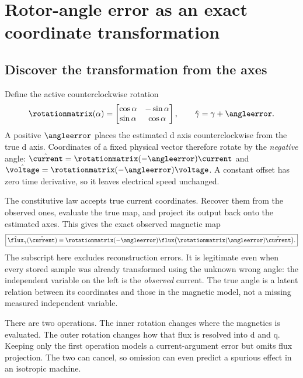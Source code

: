\section{Rotor-angle error as an exact coordinate transformation}
\label{sec:angle}
\subsection{Discover the transformation from the axes}
Define the active counterclockwise rotation
\begin{equation}
 \rotationmatrix(\alpha)=\begin{bmatrix}\cos\alpha&-\sin\alpha\\
                  \sin\alpha&\cos\alpha\end{bmatrix},\qquad
 \hat\gamma=\gamma+\angleerror.\label{eq:rotation-definition}
\end{equation}
A positive $\angleerror$ places the estimated d axis counterclockwise from the
true d axis. Coordinates of a fixed physical vector therefore rotate by the
\emph{negative} angle: $\hat\current=\rotationmatrix(-\angleerror)\current$ and
$\hat\voltage=\rotationmatrix(-\angleerror)\voltage$. A constant offset has zero time
derivative, so it leaves electrical speed unchanged.


The constitutive law accepts true current coordinates. Recover them from the
observed ones, evaluate the true map, and project its output back onto the
estimated axes. This gives the exact observed magnetic map
\begin{equation}
 \boxed{\hat\flux_\gamma(\hat\current)=\rotationmatrix(-\angleerror)
       \flux\bigl(\rotationmatrix(\angleerror)\hat\current\bigr).}
 \label{eq:pullback}
\end{equation}
The subscript here excludes reconstruction errors. It is legitimate even
when every stored sample was already transformed using the unknown wrong
angle: the independent variable on the left is the \emph{observed} current.
The true angle is a latent relation between its coordinates and those in the
magnetic model, not a missing measured independent variable.

There are two operations. The inner rotation changes where the magnetics is
evaluated. The outer rotation changes how that flux is resolved into d and q.
Keeping only the first operation models a current-argument error but omits
flux projection. The two can cancel, so omission can even predict a spurious
effect in an isotropic machine.


